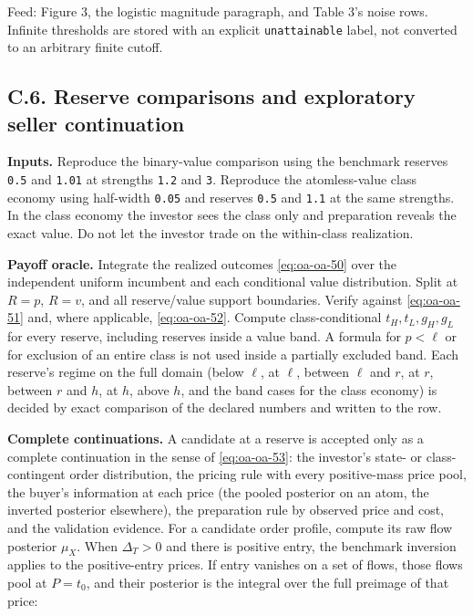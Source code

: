 \documentclass[
  11pt,
]{article}
\begin{document}
Feed: Figure 3, the logistic magnitude paragraph, and Table 3's noise
rows. Infinite thresholds are stored with an explicit
\texttt{unattainable} label, not converted to an arbitrary finite
cutoff.

\subsection{C.6. Reserve comparisons and exploratory seller
continuation}\label{oa-c-reserve}

\textbf{Inputs.} Reproduce the binary-value comparison using the
benchmark reserves \texttt{0.5} and \texttt{1.01} at strengths
\texttt{1.2} and \texttt{3}. Reproduce the atomless-value class economy
using half-width \texttt{0.05} and reserves \texttt{0.5} and
\texttt{1.1} at the same strengths. In the class economy the investor
sees the class only and preparation reveals the exact value. Do not let
the investor trade on the within-class realization.

\textbf{Payoff oracle.} Integrate the realized outcomes
\eqref{eq:oa-oa-50} over the independent uniform incumbent and each
conditional value distribution. Split at \(R=p\), \(R=v\), and all
reserve/value support boundaries. Verify against \eqref{eq:oa-oa-51}
and, where applicable, \eqref{eq:oa-oa-52}. Compute class-conditional
\(t_H,t_L,g_H,g_L\) for every reserve, including reserves inside a value
band. A formula for \(p<\ell\) or for exclusion of an entire class is
not used inside a partially excluded band. Each reserve's regime on the
full domain (below \(\ell\), at \(\ell\), between \(\ell\) and \(r\), at
\(r\), between \(r\) and \(h\), at \(h\), above \(h\), and the band
cases for the class economy) is decided by exact comparison of the
declared numbers and written to the row.

\textbf{Complete continuations.} A candidate at a reserve is accepted
only as a complete continuation in the sense of \eqref{eq:oa-oa-53}: the
investor's state- or class-contingent order distribution, the pricing
rule with every positive-mass price pool, the buyer's information at
each price (the pooled posterior on an atom, the inverted posterior
elsewhere), the preparation rule by observed price and cost, and the
validation evidence. For a candidate order profile, compute its raw flow
posterior \(\mu_X\). When \(\Delta_T>0\) and there is positive entry,
the benchmark inversion applies to the positive-entry prices. If entry
vanishes on a set of flows, those flows pool at \(P=t_0\), and their
posterior is the integral over the full preimage of that price:
\end{document}
